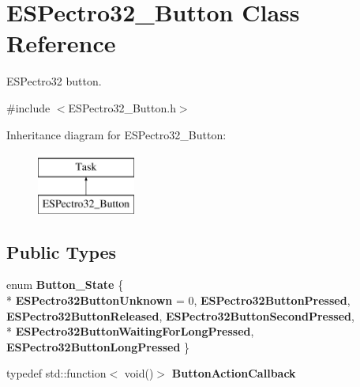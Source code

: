 \hypertarget{classESPectro32__Button}{\section{E\-S\-Pectro32\-\_\-\-Button Class Reference}
\label{classESPectro32__Button}
}


E\-S\-Pectro32 button.  




{\ttfamily \#include $<$E\-S\-Pectro32\-\_\-\-Button.\-h$>$}

Inheritance diagram for E\-S\-Pectro32\-\_\-\-Button\-:\begin{figure}[H]
\begin{center}
\leavevmode
\includegraphics[height=2.000000cm]{classESPectro32__Button}
\end{center}
\end{figure}
\subsection*{Public Types}
\begin{DoxyCompactItemize}
\item 
enum {\bfseries Button\-\_\-\-State} \{ \\*
{\bfseries E\-S\-Pectro32\-Button\-Unknown} = 0, 
{\bfseries E\-S\-Pectro32\-Button\-Pressed}, 
{\bfseries E\-S\-Pectro32\-Button\-Released}, 
{\bfseries E\-S\-Pectro32\-Button\-Second\-Pressed}, 
\\*
{\bfseries E\-S\-Pectro32\-Button\-Waiting\-For\-Long\-Pressed}, 
{\bfseries E\-S\-Pectro32\-Button\-Long\-Pressed}
 \}
\item 
\hypertarget{classESPectro32__Button_afff4b934b4520b3c42d2792c67dbbe50}{typedef std\-::function$<$ void()$>$ {\bfseries Button\-Action\-Callback}}\label{classESPectro32__Button_afff4b934b4520b3c42d2792c67dbbe50}

\end{DoxyCompactItemize}
